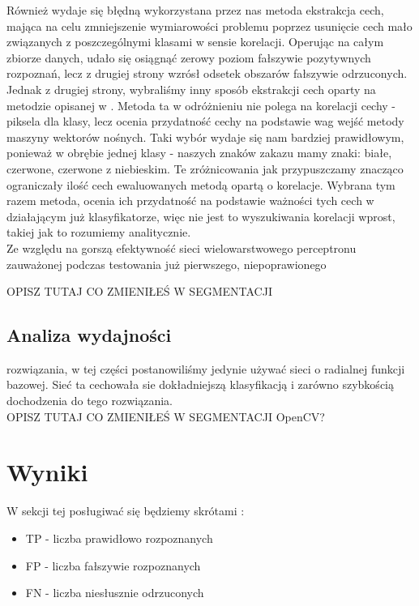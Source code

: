 \documentclass{classrep}
\begin{document}
\indent Również wydaje się błędną wykorzystana przez nas metoda ekstrakcja cech, mająca na celu zmniejszenie wymiarowości problemu poprzez usunięcie cech mało związanych z poszczególnymi klasami w sensie korelacji. Operując na całym zbiorze danych, udało się osiągnąć zerowy poziom fałszywie pozytywnych rozpoznań, lecz z drugiej strony wzrósł odsetek obszarów fałszywie odrzuconych.\\
Jednak z drugiej strony, wybraliśmy inny sposób ekstrakcji cech oparty na metodzie opisanej w \cite{GuyonEtAl02}. Metoda ta w odróżnieniu nie polega na korelacji cechy - piksela dla klasy, lecz ocenia przydatność cechy na podstawie wag wejść metody maszyny wektorów nośnych. Taki wybór wydaje się nam bardziej prawidłowym, ponieważ w obrębie jednej klasy - naszych znaków zakazu mamy znaki: białe, czerwone, czerwone z niebieskim. Te zróżnicowania jak przypuszczamy znacząco ograniczały ilość cech ewaluowanych metodą opartą o korelacje. Wybrana tym razem metoda, ocenia ich przydatność na podstawie ważności tych cech w działającym już klasyfikatorze, więc nie jest to wyszukiwania korelacji wprost, takiej jak to rozumiemy analitycznie.\\


\indent Ze względu na gorszą efektywność sieci wielowarstwowego perceptronu zauważonej podczas testowania już pierwszego, niepoprawionego 


{\Large{OPISZ TUTAJ CO ZMIENIŁEŚ W SEGMENTACJI}}


\subsection{Analiza wydajności}

rozwiązania, w tej części postanowiliśmy jedynie używać sieci o radialnej funkcji bazowej. Sieć ta cechowała sie dokładniejszą klasyfikacją i zarówno szybkością dochodzenia do tego rozwiązania.\\


{\Large{OPISZ TUTAJ CO ZMIENIŁEŚ W SEGMENTACJI}}
OpenCV?

\section{Wyniki}


W sekcji tej posługiwać się będziemy skrótami :
\begin{itemize}
\item TP - liczba prawidłowo rozpoznanych\\
\item FP - liczba fałszywie rozpoznanych\\
\item FN - liczba niesłusznie odrzuconych\\
\end{itemize}
\end{document}
